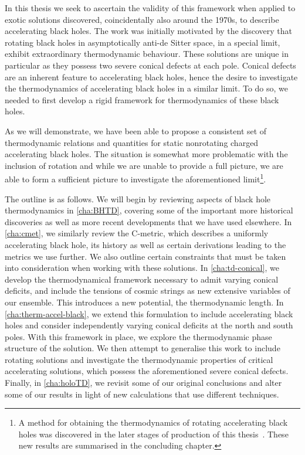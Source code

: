 \documentclass[
twoside,
openright,
frontopenright,
]{dmathesis}
\begin{document}
In this thesis we seek to ascertain the validity of this framework when applied
to exotic solutions discovered, coincidentally also around the 1970s, to
describe accelerating black holes. The work was initially motivated by the
discovery that rotating black holes in asymptotically anti-de Sitter space, in a
special limit, exhibit extraordinary thermodynamic behaviour. These solutions
are unique in particular as they possess two severe conical defects at each
pole. Conical defects are an inherent feature to accelerating black holes, hence
the desire to investigate the thermodynamics of accelerating black holes in a
similar limit. To do so, we needed to first develop a rigid framework for
thermodynamics of these black holes.

As we will demonstrate, we have been able to propose a consistent set of
thermodynamic relations and quantities for static nonrotating charged
accelerating black holes. The situation is somewhat more problematic with the
inclusion of rotation and while we are unable to provide a full picture, we are
able to form a sufficient picture to investigate the aforementioned
limit\footnote{A method for obtaining the thermodynamics of rotating
  accelerating black holes was discovered in the later stages of production of
  this thesis~\cite{Anabalon:2018aa}. These new results are summarised in the
  concluding chapter.}.

The outline is as follows. We will begin by reviewing aspects of black hole
thermodynamics in \cref{cha:BHTD}, covering some of the important more
historical discoveries as well as more recent developments that we have used
elsewhere. In \cref{cha:cmet}, we similarly review the C-metric, which
describes a uniformly accelerating black hole, its history as well as certain
derivations leading to the metrics we use further. We also outline certain
constraints that must be taken into consideration when working with these
solutions. In \cref{cha:td-conical}, we develop the thermodynamical framework
necessary to admit varying conical deficits, and include the tensions of cosmic
strings as new extensive variables of our ensemble. This introduces a new
potential, the thermodynamic length. In \cref{cha:therm-accel-black}, we extend
this formulation to include accelerating black holes and consider independently
varying conical deficits at the north and south poles. With this framework in
place, we explore the thermodynamic phase structure of the solution. We then
attempt to generalise this work to include rotating solutions and investigate
the thermodynamic properties of critical accelerating solutions, which possess
the aforementioned severe conical defects. Finally, in \cref{cha:holoTD}, we
revisit some of our original conclusions and alter some of our results in light
of new calculations that use different techniques.
\end{document}
